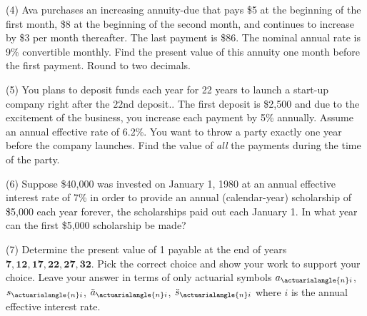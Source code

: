 \documentclass[11pt]{article}
\begin{document}
(4) Ava purchases an increasing annuity-due that pays \$5 at the beginning of the first month, \$8 at the beginning of the second month, and continues to increase by \$3 per month thereafter. The last payment is \$86. The nominal annual rate is 9\% convertible monthly. Find the present value of this annuity one month before the first payment. Round to two decimals.

\vspace{1em}

(5) You plans to deposit funds each year for 22 years to launch a start-up company right after the $22$nd deposit..  
The first deposit is \$2{,}500 and due to the excitement of the business, you increase each payment by 5\% annually.  
Assume an annual effective rate of 6.2\%. You want to throw a party exactly one year before the company launches. Find the value of \textit{all} the payments during the time of the party.


\vspace{1em}

(6) Suppose \$40{,}000 was invested on January 1, 1980 at an annual effective interest rate of 7\% in order to provide an annual (calendar-year) scholarship of \$5{,}000 each year forever, the scholarships paid out each January 1. In what year can the first \$5{,}000 scholarship be made?
\vspace{2em}


(7) Determine the present value of 1 payable at the end of years \(\mathbf{7, 12, 17, 22, 27, 32}\).  
Pick the correct choice and show your work to support your choice.  Leave your answer in terms of only actuarial symbols $a_{\actuarialangle{n}i}$, $s_{\actuarialangle{n}i}$, $\ddot{a}_{\actuarialangle{n}i}$, 
$\ddot{s}_{\actuarialangle{n}i}$ where $i$ is the annual effective interest rate. 
\end{document}
